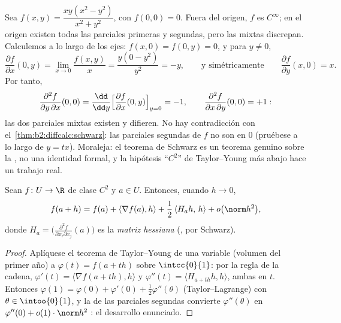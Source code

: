 \begin{example}\label{ex:b2:diffcalc:peano}
Sea $f(x, y) = \dfrac{xy(x^2 - y^2)}{x^2 + y^2}$, con $f(0,0) = 0$.
Fuera del origen, $f$ es $C^\infty$; en el origen existen todas las
parciales primeras y segundas, pero las mixtas discrepan. Calculemos
a lo largo de los ejes: $f(x, 0) = f(0, y) = 0$, y para $y \neq 0$,
\[
\frac{\partial f}{\partial x}(0, y)
= \lim_{x\to0}\frac{f(x,y)}{x}
= \frac{y(0 - y^2)}{y^2} = -y ,
\qquad\text{y simétricamente}\qquad
\frac{\partial f}{\partial y}(x, 0) = x .
\]
Por tanto,
\[
\frac{\partial^2 f}{\partial y\,\partial x}(0,0)
= \frac{\dd}{\dd y}\Bigl[\frac{\partial f}{\partial
x}(0,y)\Bigr]_{y=0} = -1,
\qquad
\frac{\partial^2 f}{\partial x\,\partial y}(0,0) = +1 :
\]
las dos parciales mixtas existen y difieren. No hay contradicción con
el~\cref{thm:b2:diffcalc:schwarz}: las parciales segundas de $f$ no
son  en $0$ (pruébese a lo largo de $y = tx$). Moraleja: el
teorema de Schwarz es un teorema genuino sobre la
\emph{}, no una identidad formal, y la hipótesis ``$C^2$''
de Taylor--Young más abajo hace un trabajo real.
\end{example}

\begin{theorem}\label{thm:b2:diffcalc:taylor}
Sean $f \colon U \to \R$ de clase $C^2$ y $a \in U$. Entonces, cuando
$h \to 0$,
\[
f(a + h) = f(a) + \langle\nabla f(a), h\rangle
+ \frac12\, \langle H_a h,\, h\rangle + o\bigl(\norm h^2\bigr),
\]
donde $H_a = \bigl(\frac{\partial^2 f}{\partial x_i\partial
x_j}(a)\bigr)$ es la \emph{matriz hessiana}
(, por Schwarz).
\end{theorem}

\begin{proof}
Aplíquese el teorema de Taylor--Young de una variable (volumen del
primer año) a $\varphi(t) = f(a + th)$ sobre $\intcc{0}{1}$: por la
regla de la cadena, $\varphi'(t) = \langle \nabla f(a + th),
h\rangle$ y $\varphi''(t) = \langle H_{a+th}h, h\rangle$, ambas
 en $t$. Entonces $\varphi(1) = \varphi(0) + \varphi'(0) +
\frac12\varphi''(\theta)$ (Taylor--Lagrange) con $\theta \in
\intoo{0}{1}$, y la  de las parciales segundas convierte
$\varphi''(\theta)$ en $\varphi''(0) + o(1)\cdot\norm h^2$
: el desarrollo enunciado.
\end{proof}

